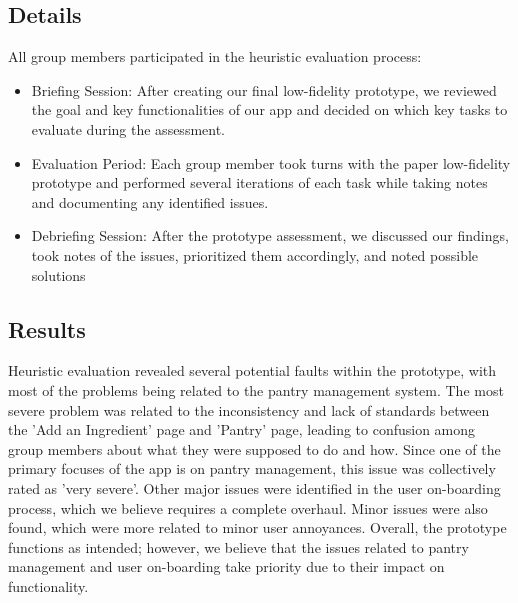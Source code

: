 \documentclass[manuscript, screen, nonacm]{acmart}
\begin{document}
\subsection{Details}
All group members participated in the heuristic evaluation process:
\begin{itemize}
    \item Briefing Session: After creating our final low-fidelity prototype, we reviewed the goal and key functionalities of our app and decided on which key tasks to evaluate during the assessment.
    \item Evaluation Period: Each group member took turns with the paper low-fidelity prototype and performed several iterations of each task while taking notes and documenting any identified issues.
    \item Debriefing Session: After the prototype assessment, we discussed our findings, took notes of the issues, prioritized them accordingly, and noted possible solutions

     
\end{itemize}




\subsection{Results}
Heuristic evaluation revealed several potential faults within the prototype, with most of the problems being related to the pantry management system. The most severe problem was related to the inconsistency and lack of standards between the 'Add an Ingredient' page and 'Pantry' page, leading to confusion among group members about what they were supposed to do and how. Since one of the primary focuses of the app is on pantry management, this issue was collectively rated as 'very severe'. Other major issues were identified in the user on-boarding process, which we believe requires a complete overhaul. Minor issues were also found, which were more related to minor user annoyances. Overall, the prototype functions as intended; however, we believe that the issues related to pantry management and user on-boarding take priority due to their impact on functionality.
\end{document}
